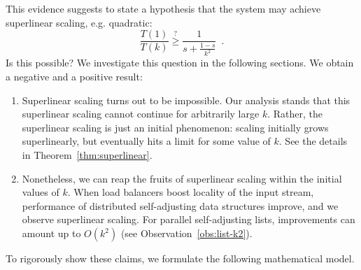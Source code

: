 This evidence suggests to state a hypothesis that the system may achieve superlinear scaling, e.g. quadratic:
\begin{equation*}\label{eq:mtf-perf}
  \frac{T(1)}{T(k)} \overset{?}{\ge} \frac1{s + \frac{1-s}{k^2}} \enspace .
\end{equation*}
Is this possible? We investigate this question in the following sections.
We obtain a negative and a positive result:
\begin{enumerate}
\item Superlinear scaling turns out to be impossible.
Our analysis  stands that this superlinear scaling cannot continue for arbitrarily large $k$.
Rather, the superlinear scaling is just an initial phenomenon: scaling initially grows superlinearly, but eventually hits a limit for some value of $k$. See the details in Theorem~\ref{thm:superlinear}.

\item
Nonetheless, we can reap the fruits of superlinear scaling within the initial values of $k$. When load balancers boost locality of the input stream, performance of distributed self-adjusting data structures improve, and we observe superlinear scaling. For parallel self-adjusting lists, improvements can amount up to $O(k^2)$ (see Observation~\ref{obs:list-k2}).
\end{enumerate}
To rigorously show these claims, we formulate the following mathematical model.






